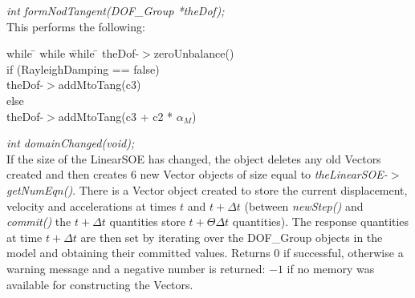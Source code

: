 {\em int formNodTangent(DOF\_Group *theDof);} \\
This performs the following:
\begin{tabbing}
while \= \+ while \= while \= \kill
theDof-$>$zeroUnbalance() \\
if (RayleighDamping == false)  \+ \\
theDof-$>$addMtoTang(c3)  \- \\
else \+ \\
theDof-$>$addMtoTang(c3 + c2 * $\alpha_M$)  \- \\ 
\end{tabbing}


{\em int domainChanged(void);}\\
If the size of the LinearSOE has changed, the object deletes any old Vectors
created and then creates $6$ new Vector objects of size equal to {\em
theLinearSOE-$>$getNumEqn()}. There is a Vector object created to store
the current displacement, velocity and accelerations at times $t$ and
$t + \Delta t$ (between {\em newStep()} and {\em commit()} the $t +
\Delta t$ quantities store $t + \Theta \Delta t$ quantities).
The response quantities at time $t + \Delta t$ are
then set by iterating over the DOF\_Group objects in the model and
obtaining their committed values. 
Returns $0$ if successful, otherwise a warning message and a negative
number is returned: $-1$ if no memory was available for constructing
the Vectors. \\


